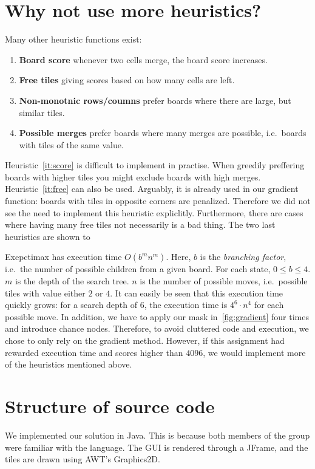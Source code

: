 \documentclass[journal]{IEEEtran}
\begin{document}
\section*{Why not use more heuristics?}

Many other heuristic functions exist:
\begin{enumerate}
    \item\label{it:score} \textbf{Board score} \textendash{} whenever two cells merge, the board score increases.
    \item\label{it:free} \textbf{Free tiles} \textendash{} giving scores based on how many cells are left.
    \item\label{it:nonmono} \textbf{Non-monotnic rows/coumns} \textendash{} prefer boards where there are large, but similar
        tiles.
    \item\label{it:merges} \textbf{Possible merges} \textendash{} prefer boards where many merges are possible,
       i.e.\ boards with tiles of the same value.
\end{enumerate}

Heuristic~\ref{it:score} is difficult to implement in practise. When greedily preffering
boards with higher tiles you might exclude boards with high merges.
Heuristic~\ref{it:free} can also be used. Arguably, it is already used in our gradient
function: boards with tiles in opposite corners are penalized. Therefore we did
not see the need to implement this heuristic expliclitly. Furthermore, there are
cases where having many free tiles not necessarily is a bad thing.
The two last heuristics are shown to

Exepctimax has execution time $O(b^{m}n^{m})$. Here, $b$ is the \textit{branching factor},
i.e.\ the number of possible children from a given board. For each state, $0
\leq b \leq 4$.  $m$ is the depth of the search tree. $n$ is the number of possible
moves, i.e.\ possible tiles with value either $2$ or $4$. It can easily be seen
that this execution time quickly grows: for a search depth of 6, the execution
time is $4^{6}\cdot{n^{4}}$ for each possible move. In addition, we have to apply our mask
in~\autoref{fig:gradient} four times and introduce chance nodes. Therefore, to
avoid cluttered code and execution, we chose to only rely on the gradient
method. However, if this assignment had rewarded execution time and scores
higher than $4096$, we would implement more of the heuristics mentioned above.

\section*{Structure of source code}
We implemented our solution in Java. This is because both members of the group
were familiar with the language. The GUI is rendered through a JFrame, and the tiles are
drawn using AWT's Graphics2D.
\end{document}
